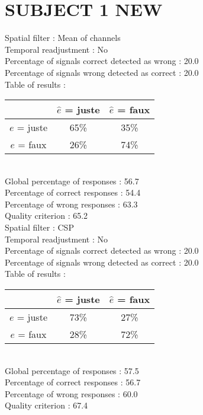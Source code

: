 \section*{SUBJECT 1 NEW}
Spatial filter : Mean of channels \\
Temporal readjustment : No \\
Percentage of signals correct detected as wrong :   20.0 \\
Percentage of signals wrong detected as correct :   20.0 \\
Table of results : \\
\begin{tabular}{|c|c|c|}
\hline				& $\hat{e}$ = juste & $\hat{e}$ = faux \\
\hline  $e$ = juste	&     65\%			&     35\%		\\
\hline  $e$ = faux	&     26\%			&     74\%		\\
\hline
\end{tabular}\\
Global percentage of responses :   56.7 \\
Percentage of correct responses :   54.4 \\
Percentage of wrong responses :   63.3 \\
Quality criterion :   65.2 \\

Spatial filter : CSP \\
Temporal readjustment : No \\
Percentage of signals correct detected as wrong :   20.0 \\
Percentage of signals wrong detected as correct :   20.0 \\
Table of results : \\
\begin{tabular}{|c|c|c|}
\hline				& $\hat{e}$ = juste & $\hat{e}$ = faux \\
\hline  $e$ = juste	&     73\%			&     27\%		\\
\hline  $e$ = faux	&     28\%			&     72\%		\\
\hline
\end{tabular}\\
Global percentage of responses :   57.5 \\
Percentage of correct responses :   56.7 \\
Percentage of wrong responses :   60.0 \\
Quality criterion :   67.4 \\

